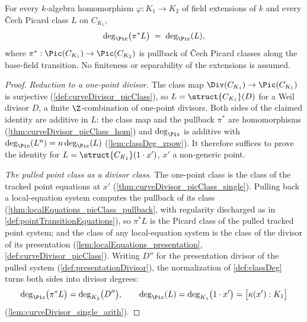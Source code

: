 \begin{theorem}
  \label{thm:classDeg_cechPicMap_baseFieldTransition}
  \leanok
  For every \(k\)-algebra homomorphism \(\varphi : K_1 \to K_2\) of field extensions of
  \(k\) and every \v Cech Picard class \(L\) on \(C_{K_1}\),
  \[
    \deg_{\Pic}\bigl(\pi^{*}L\bigr) \;=\; \deg_{\Pic}(L),
  \]
  where \(\pi^{*} : \Pic(C_{K_1}) \to \Pic(C_{K_2})\) is pullback of \v Cech Picard
  classes along the base-field transition. No finiteness or separability of the
  extensions is assumed.
\end{theorem}
\begin{proof}
  \leanok
  \emph{Reduction to a one-point divisor.} The class map
  \(\Div(C_{K_1}) \to \Pic(C_{K_1})\) is surjective (\ref{def:curveDivisor_picClass}),
  so \(L = \struct{C_{K_1}}(D)\) for a Weil divisor \(D\), a finite \(\Z\)-combination of
  one-point divisors. Both sides of the claimed identity are additive in \(L\): the
  class map and the pullback \(\pi^{*}\) are homomorphisms
  (\ref{thm:curveDivisor_picClass_hom}) and \(\deg_{\Pic}\) is additive with
  \(\deg_{\Pic}(L^n) = n\deg_{\Pic}(L)\) (\ref{lem:classDeg_zpow}). It therefore
  suffices to prove the identity for \(L = \struct{C_{K_1}}(1 \cdot x')\), \(x'\) a
  non-generic point.

  \emph{The pulled point class as a divisor class.} The one-point class is the class
  of the tracked point equations at \(x'\)
  (\ref{thm:curveDivisor_picClass_single}). Pulling back a local-equation system
  computes the pullback of its class (\ref{thm:localEquations_picClass_pullback},
  with regularity discharged as in \ref{def:pointTransitionEquations}), so
  \(\pi^{*}L\) is the Picard class of the pulled tracked point system; and the class
  of any local-equation system is the class of the divisor of its presentation
  (\ref{lem:localEquations_presentation}, \ref{def:curveDivisor_picClass}). Writing
  \(D''\) for the presentation divisor of the pulled system
  (\ref{def:presentationDivisor}), the normalization of \ref{def:classDeg} turns both
  sides into divisor degrees:
  \[
    \deg_{\Pic}\bigl(\pi^{*}L\bigr) = \deg_{K_2}\bigl(D''\bigr), \qquad
    \deg_{\Pic}(L) = \deg_{K_1}\bigl(1 \cdot x'\bigr) = \bigl[\kappa(x') : K_1\bigr]
  \]
  (\ref{lem:curveDivisor_single_arith}).


\end{proof}
